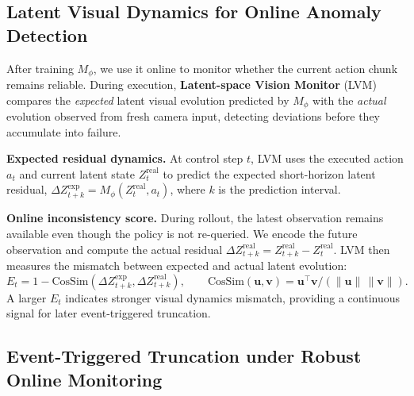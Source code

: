 \subsection{Latent Visual Dynamics for Online Anomaly Detection}

After training $M_\phi$, we use it online to monitor whether the current action chunk remains reliable. During execution, \textbf{Latent-space Vision Monitor} (LVM) compares the \emph{expected} latent visual evolution predicted by $M_\phi$ with the \emph{actual} evolution observed from fresh camera input, detecting deviations before they accumulate into failure.

\textbf{Expected residual dynamics.}
At control step $t$, LVM uses the executed action $a_t$ and current latent state $Z_t^{\mathrm{real}}$ to predict the expected short-horizon latent residual, $\Delta Z_{t+k}^{\mathrm{exp}}=M_\phi(Z_t^{\mathrm{real}},a_t)$, where $k$ is the prediction interval.

\textbf{Online inconsistency score.}
During rollout, the latest observation remains available even though the policy is not re-queried. We encode the future observation and compute the actual residual $\Delta Z_{t+k}^{\mathrm{real}}=Z_{t+k}^{\mathrm{real}}-Z_t^{\mathrm{real}}$. LVM then measures the mismatch between expected and actual latent evolution:
\begin{equation}
E_t = 1 - \mathrm{CosSim}\!\left(\Delta Z_{t+k}^{\mathrm{exp}}, \Delta Z_{t+k}^{\mathrm{real}}\right),
\qquad
\mathrm{CosSim}(\mathbf{u},\mathbf{v}) =
\mathbf{u}^{\top}\mathbf{v}/(\|\mathbf{u}\|\,\|\mathbf{v}\|).
\label{eq:inconsistency_score}
\end{equation}
A larger $E_t$ indicates stronger visual dynamics mismatch, providing a continuous signal for later event-triggered truncation.

\subsection{Event-Triggered Truncation under Robust Online Monitoring}

